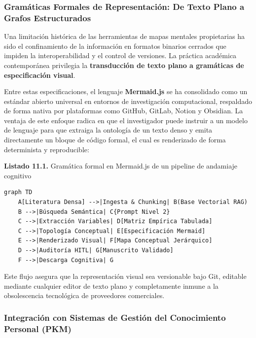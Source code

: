 \subsubsection{Gramáticas Formales de Representación: De Texto Plano a Grafos Estructurados}

Una limitación histórica de las herramientas de mapas mentales propietarias ha sido el confinamiento de la información en formatos binarios cerrados que impiden la interoperabilidad y el control de versiones. La práctica académica contemporánea privilegia la \textbf{transducción de texto plano a gramáticas de especificación visual}.

Entre estas especificaciones, el lenguaje \textbf{Mermaid.js} se ha consolidado como un estándar abierto universal en entornos de investigación computacional, respaldado de forma nativa por plataformas como GitHub, GitLab, Notion y Obsidian. La ventaja de este enfoque radica en que el investigador puede instruir a un modelo de lenguaje para que extraiga la ontología de un texto denso y emita directamente un bloque de código formal, el cual es renderizado de forma determinista y reproducible:

\begin{tcolorbox}[colback=white, colframe=unmsm_gold, arc=3pt, boxrule=0.8pt, top=0.3cm, bottom=0.3cm, left=0.4cm, right=0.4cm]
\small\sffamily
\textbf{Listado 11.1.} Gramática formal en Mermaid.js de un pipeline de andamiaje cognitivo
\vspace{0.2cm}
\begin{verbatim}
graph TD
    A[Literatura Densa] -->|Ingesta & Chunking| B(Base Vectorial RAG)
    B -->|Búsqueda Semántica| C{Prompt Nivel 2}
    C -->|Extracción Variables| D[Matriz Empírica Tabulada]
    C -->|Topología Conceptual| E[Especificación Mermaid]
    E -->|Renderizado Visual| F[Mapa Conceptual Jerárquico]
    D -->|Auditoría HITL| G[Manuscrito Validado]
    F -->|Descarga Cognitiva| G
\end{verbatim}
\end{tcolorbox}

Este flujo asegura que la representación visual sea versionable bajo Git, editable mediante cualquier editor de texto plano y completamente inmune a la obsolescencia tecnológica de proveedores comerciales.

\subsubsection{Integración con Sistemas de Gestión del Conocimiento Personal (PKM)}

